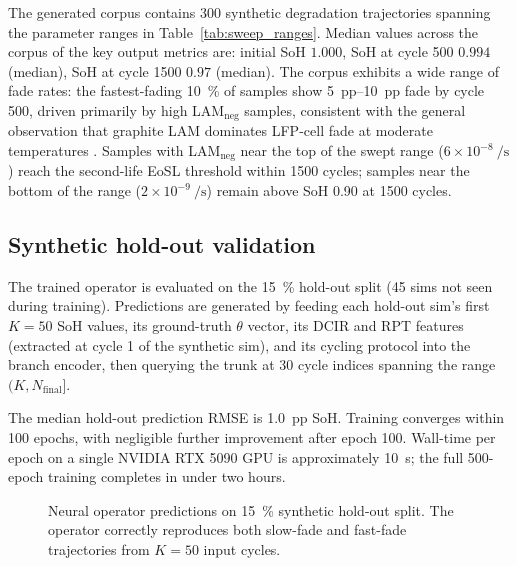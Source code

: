 \documentclass[preprint,12pt,3p,authoryear]{elsarticle}
\begin{document}
The generated corpus contains \num{300} synthetic degradation
trajectories spanning the parameter ranges in
Table~\ref{tab:sweep_ranges}. Median values across the corpus of the
key output metrics are: initial SoH \(1.000\), SoH at cycle \num{500}
\(0.994\) (median), SoH at cycle \num{1500} \(0.97\) (median). The
corpus exhibits a wide range of fade rates: the fastest-fading
\qty{10}{\percent} of samples show \qty{5}{pp}--\qty{10}{pp} fade by
cycle \num{500}, driven primarily by high LAM\(_\text{neg}\) samples,
consistent with the general observation that graphite LAM dominates
LFP-cell fade at moderate temperatures \citep{birkl2017degradation}.
Samples with LAM\(_\text{neg}\) near the top of the swept range
(\(6\times 10^{-8}\ \si{\per\second}\)) reach the second-life EoSL
threshold within \num{1500} cycles; samples near the bottom of the
range (\(2\times 10^{-9}\ \si{\per\second}\)) remain above SoH
\num{0.90} at \num{1500} cycles.

\subsection{Synthetic hold-out validation}
\label{sec:results:validation}

The trained operator is evaluated on the \qty{15}{\percent} hold-out
split (\num{45} sims not seen during training). Predictions are
generated by feeding each hold-out sim's first \(K = 50\) SoH values,
its ground-truth \(\theta\) vector, its DCIR and RPT features (extracted
at cycle 1 of the synthetic sim), and its cycling protocol into the
branch encoder, then querying the trunk at \num{30} cycle indices spanning
the range \((K, N_\text{final}]\).

The median hold-out prediction RMSE is \SI{1.0}{pp} SoH. Training
converges within \num{100} epochs, with negligible further improvement
after epoch \num{100}. Wall-time per epoch on a single NVIDIA RTX 5090
GPU is approximately \SI{10}{\second}; the full \num{500}-epoch training
completes in under two hours.

\begin{figure}[!t]
    \centering
    \caption{Neural operator predictions on \qty{15}{\percent}
    synthetic hold-out split. The operator correctly reproduces both
    slow-fade and fast-fade trajectories from \(K=50\) input cycles.}
    \label{fig:synth_holdout}
\end{figure}
\end{document}
